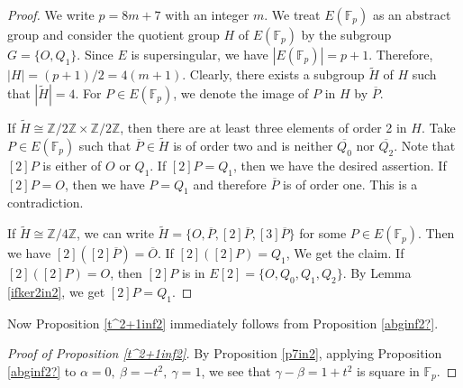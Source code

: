 \documentclass[a4paper, 11pt]{article}
\theoremstyle{plain}
\newcommand{\?}{\textcolor{red}{??}}
\newcommand{\fp}{\mathbb{F}_p}
\begin{document}
\begin{proof}
    We write $p=8m+7$ with an integer $m$. We treat $E(\fp)$ as an abstract group and consider the quotient group $H$ of $E(\fp)$ by the subgroup $G=\{ O,Q_1\}$. Since $E$ is supersingular, we have $|E(\fp)|=p+1$. Therefore,
    $|H|=(p+1)/2=4(m+1)$.
Clearly, there exists a subgroup $\widetilde{H}$ of $H$ such that $|\widetilde{H}|=4$. For $P\in E(\fp)$, we denote the image of $P$ in $H$ by $\overline{P}$.
   
    If $\widetilde{H} \cong \mathbb{Z}/2\mathbb{Z} \times \mathbb{Z}/2\mathbb{Z}$, then there are at least  three elements of order 2 in $H$. 
    Take  $P\in E(\fp)$ such that $\overline{P}\in \widetilde{H}$ is of order two and is neither $\overline{Q_0}$ nor $\overline{Q_2}$. Note that $[2]P$ is either of $O$ or $Q_1$. If $[2]P = Q_1$, then we have the desired assertion. If $[2]P=O$, then we have $P=Q_1$ and therefore $\overline{P}$ is of order one. This is a contradiction.

    If $\widetilde{H} \cong \mathbb{Z}/4\mathbb{Z} $, we can write $\widetilde{H}=\{ O,\overline{P},[2]\overline{P},[3]\overline{P} \}$ for some $P \in E(\fp)$. Then we have $[2]([2]\overline{P})=\overline{O}$. If $[2]([2]P)=Q_1$, We get the claim. If $[2]([2]P)=O$, then $[2]P$ is in $E[2]=\{ O,Q_0,Q_1,Q_2\}$. By Lemma \ref{ifker2in2}, we get $[2]P=Q_1$.
\end{proof}
Now Proposition \ref{t^2+1inf2} immediately follows from Proposition \ref{abginf2?}.
\begin{proof}[Proof of Proposition \ref{t^2+1inf2}]
    By Proposition \ref{p7in2}, applying Proposition \ref{abginf2?} to $\alpha=0,\ \beta=-t^2,\ \gamma=1$, we see that $\gamma-\beta=1+t^2$ is square in $\fp$.
\end{proof}
\end{document}
